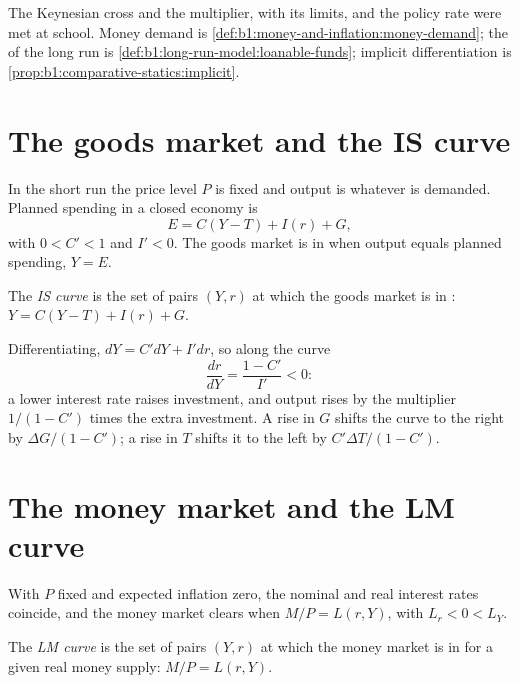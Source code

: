 \begin{recall}
The Keynesian cross and the multiplier, with its limits, and the policy
rate were met at school. Money demand is
\cref{def:b1:money-and-inflation:money-demand}; the 
of the long run is \cref{def:b1:long-run-model:loanable-funds}; implicit
differentiation is \cref{prop:b1:comparative-statics:implicit}.
\end{recall}

\section{The goods market and the IS curve}\label{sec:b1:is-lm:is}

In the short run the price level $P$ is fixed and output is whatever is
demanded. Planned spending in a closed economy is
\[
E = C(Y - T) + I(r) + G,
\]
with $0 < C' < 1$ and $I' < 0$. The goods market is in  when output
equals planned spending, $Y = E$.

\begin{definition}[IS curve]\label{def:b1:is-lm:is}
The \emph{IS curve} is the set of pairs $(Y, r)$ at which the goods market is
in : $Y = C(Y - T) + I(r) + G$.
\end{definition}

Differentiating, $dY = C'dY + I'dr$, so along the curve
\[
\frac{dr}{dY} = \frac{1 - C'}{I'} < 0 :
\]
a lower interest rate raises investment, and output rises by the
multiplier $1/(1 - C')$ times the extra investment. A rise in $G$ shifts the
curve to the right by $\Delta G/(1 - C')$; a rise in $T$ shifts it to the left by
$C'\Delta T/(1 - C')$.

\section{The money market and the LM curve}\label{sec:b1:is-lm:lm}

With $P$ fixed and expected inflation zero, the nominal and real interest
rates coincide, and the money market clears when $M/P = L(r, Y)$, with
$L_r < 0 < L_Y$.

\begin{definition}[LM curve]\label{def:b1:is-lm:lm}
The \emph{LM curve} is the set of pairs $(Y, r)$ at which the money market is
in  for a given real money supply: $M/P = L(r, Y)$.
\end{definition}

